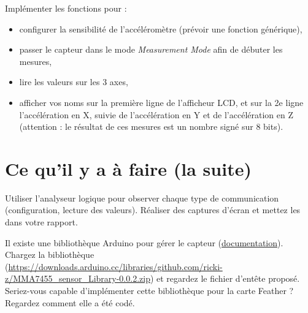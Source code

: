 \documentclass[11pt]{paper}
\begin{document}
Implémenter les fonctions pour :
\begin{itemize}
	\item configurer la sensibilité de l'accéléromètre (prévoir une fonction générique),
	\item passer le capteur dans le mode {\it Measurement Mode} afin de débuter les mesures,
	\item lire les valeurs sur les 3 axes,
	\item afficher vos noms sur la première ligne de l'afficheur LCD, et sur la 2e ligne l'accélération en X, suivie de l'accélération en Y et de l'accélération en Z (attention : le résultat de ces mesures est un nombre signé sur 8 bits).\\
\end{itemize}

  \section{Ce qu'il y a à faire (la suite)}

Utiliser l'analyseur logique pour observer chaque type de communication (configuration, lecture des valeurs). Réaliser des captures d'écran et mettez les dans votre rapport.

Il existe une bibliothèque Arduino pour gérer le capteur (\href{https://www.arduino.cc/reference/en/libraries/mma7455-sensor-library/}{documentation}). Chargez la bibliothèque (\href{https://downloads.arduino.cc/libraries/github.com/ricki-z/MMA7455_sensor_Library-0.0.2.zip}{https://downloads.arduino.cc/libraries/github.com/ricki-z/MMA7455\_sensor\_Library-0.0.2.zip}) et regardez le fichier d'entête proposé. Seriez-vous capable d'implémenter cette bibliothèque pour la carte Feather ? Regardez comment elle a été codé.
\end{document}
